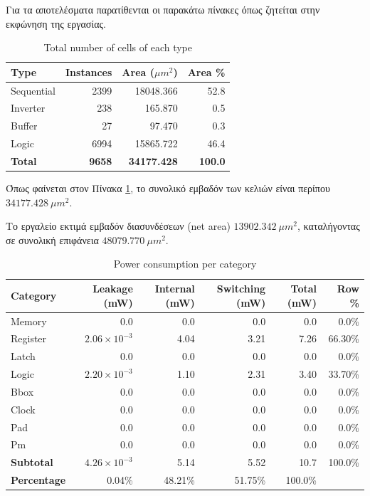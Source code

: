 Για τα αποτελέσματα παρατίθενται οι παρακάτω πίνακες όπως ζητείται στην εκφώνηση της εργασίας.
\begin{table}[H]
    \centering
    \caption{Total number of cells of each type}
    \label{tab:t1_cells}
    \begin{tabular}{lrrr}
        \toprule
        Type & Instances & Area ($\mu m^2$) & Area \% \\
        \midrule
        Sequential & 2399 & 18048.366 & 52.8 \\
        Inverter & 238 & 165.870 & 0.5 \\
        Buffer & 27 & 97.470 & 0.3 \\
        Logic & 6994 & 15865.722 & 46.4 \\
        \midrule
        \textbf{Total} & \textbf{9658} & \textbf{34177.428} & \textbf{100.0} \\
        \bottomrule
    \end{tabular}
\end{table}

Όπως φαίνεται στον Πίνακα \ref{tab:t1_cells}, το συνολικό εμβαδόν των κελιών είναι περίπου $34177.428~\mu m^2$.

Το εργαλείο εκτιμά εμβαδόν διασυνδέσεων (net area) $13902.342~\mu m^2$, καταλήγοντας σε συνολική επιφάνεια $48079.770~\mu m^2$.
\begin{table}[H]
    \centering
    \caption{Power consumption per category}
    \label{tab:t1_power}
    \begin{tabular}{lrrrrr}
        \toprule
        Category & Leakage (mW) & Internal (mW) & Switching (mW) & Total (mW) & Row \% \\
        \midrule
        Memory & 0.0 & 0.0 & 0.0 & 0.0 & 0.0\% \\
        Register & $2.06\times10^{-3}$ & 4.04 & 3.21 & 7.26 & 66.30\% \\
        Latch & 0.0 & 0.0 & 0.0 & 0.0 & 0.0\% \\
        Logic & $2.20\times10^{-3}$ & 1.10 & 2.31 & 3.40 & 33.70\% \\
        Bbox & 0.0 & 0.0 & 0.0 & 0.0 & 0.0\% \\
        Clock & 0.0 & 0.0 & 0.0 & 0.0 & 0.0\% \\
        Pad & 0.0 & 0.0 & 0.0 & 0.0 & 0.0\% \\
        Pm & 0.0 & 0.0 & 0.0 & 0.0 & 0.0\% \\
        \midrule
        \textbf{Subtotal} & $4.26\times10^{-3}$ & 5.14 & 5.52 & 10.7 & 100.0\% \\
        \textbf{Percentage} & 0.04\% & 48.21\% & 51.75\% & 100.0\% & \\
        \bottomrule
    \end{tabular}
\end{table}

